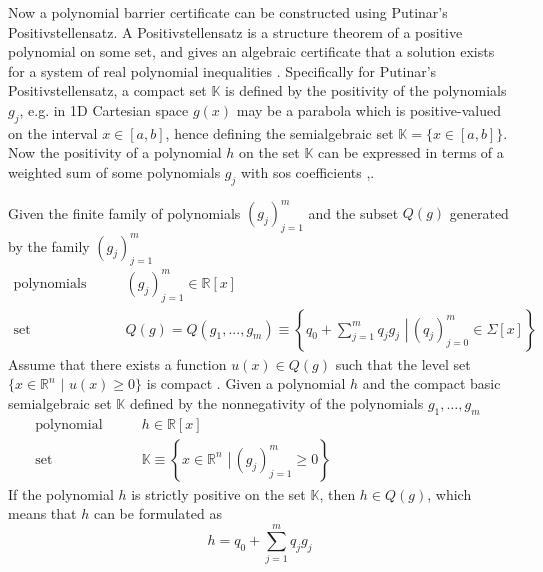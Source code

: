 Now a polynomial barrier certificate can be constructed using Putinar's Positivstellensatz.
A Positivstellensatz is a structure theorem of a positive polynomial on some set, and gives an algebraic certificate that a solution exists for a system of real polynomial inequalities \citep{bib:positivstellensatz}. 
Specifically for Putinar's Positivstellensatz, a compact set $\mathbb{K}$ is defined by the positivity of the polynomials $g_j$, e.g. in 1D Cartesian space $g(x)$ may be a parabola which is positive-valued on the interval $x\in[a,b]$, hence defining the semialgebraic set $\mathbb{K}=\{x\in[a,b]\}$.
Now the positivity of a polynomial $h$ on the set $\mathbb{K}$ can be expressed in terms of a weighted sum of some polynomials $g_j$ with \gls{sos} coefficients \citep[pp 184-186]{bib:sos_putinar_laurent},\citep[pp 28-29]{bib:sos_putinar_lasserre}.\\

 

\begin{thm}\label{def:putinar}
Given the finite family of polynomials $(g_j)_{j=1}^m$ and the subset $Q(g)$ %
generated by the family $(g_j)_{j=1}^m$ \citep[p 29]{bib:sos_putinar_lasserre}
\begin{subequations}\label{eq:putinar}
\begin{align}
\text{polynomials} \qquad & (g_j)_{j=1}^m \in\mathbb{R}[x]\\
\text{set} \qquad & Q(g)=Q(g_1,...,g_m)\equiv\left\{\left.q_0+\sum\limits_{j=1}^{m}q_jg_j\,\,\right| \, (q_j)_{j=0}^m\in\Sigma[x]\right\}\label{eq:putinar_set_sos}
\end{align}
\end{subequations}
Assume that there exists a function $u(x)\in Q(g)$ such that the level set $\{x\in\mathbb{R}^n \,\,|\,\, u(x)\geq 0\}$ is compact \citep[p 29]{bib:sos_putinar_lasserre}.
Given a polynomial $h$ and the compact basic semialgebraic set $\mathbb{K}$  defined by the nonnegativity of the polynomials $g_1,\dots, g_m$  
\begin{subequations}
\begin{align}
\text{polynomial} \qquad & h \in\mathbb{R}[x]\\
\text{set} \qquad & \mathbb{K}\equiv\left\{\left.x\in \mathbb{R}^n\,\, \right| \, (g_j)_{j=1}^m\geq0\right\}\qquad\qquad\qquad\qquad\qquad\quad
\end{align}
\end{subequations}
If the polynomial $h$ is strictly positive on the set $\mathbb{K}$, then $h\in Q(g)$, which means that $h$  can be formulated as
\begin{equation}\label{eq:sos_barrier}
h = q_0+\sum\limits_{j=1}^{m}q_jg_j
\end{equation}
\end{thm}



